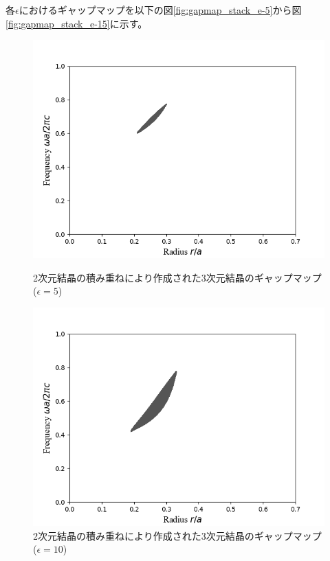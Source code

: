 \documentclass[platex,dvipdfmx]{jsreport}
\numberwithin{equation}{section}
\begin{document}
各$\epsilon$におけるギャップマップを以下の図\ref{fig:gapmap_stack_e-5}から図\ref{fig:gapmap_stack_e-15}に示す。
\begin{figure}[h]
  \begin{minipage}[h]{0.5\linewidth}
    \centering
    \includegraphics[keepaspectratio, scale=0.45]{results/gap_map/stack_e-5.png}
    \caption{2次元結晶の積み重ねにより作成された3次元結晶のギャップマップ($\epsilon = 5$)}
    \label{fig:gapmap_stack_e-5}
  \end{minipage}
  \begin{minipage}[h]{0.5\linewidth}
    \centering
    \includegraphics[keepaspectratio, scale=0.45]{results/gap_map/stack_e-10.png}
    \caption{2次元結晶の積み重ねにより作成された3次元結晶のギャップマップ($\epsilon = 10$)}
    \label{fig:gapmap_stack_e-10}
  \end{minipage}
\end{figure}
\end{document}
